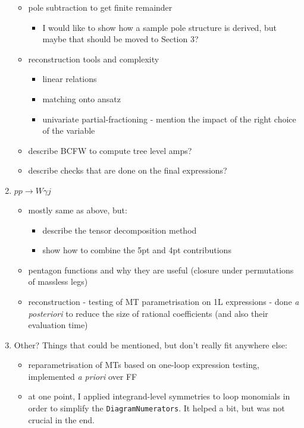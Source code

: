 \documentclass[main.tex]{subfiles}
\begin{document}
\begin{enumerate}
\begin{itemize}
        \item pole subtraction to get finite remainder
        \begin{itemize}
            \item I would like to show how a sample pole structure is derived, but maybe that should be moved to Section 3?
        \end{itemize}
        \item reconstruction tools and complexity
        \begin{itemize}
            \item linear relations
            \item matching onto ansatz
            \item univariate partial-fractioning - mention the impact of the right choice of the variable
        \end{itemize}
        \item describe BCFW to compute tree level amps?
        \item describe checks that are done on the final expressions?
    \end{itemize}
    
    \item $pp \rightarrow W \gamma j$
    \begin{itemize}
        \item mostly same as above, but:
        \begin{itemize}
            \item describe the tensor decomposition method
            \item show how to combine the 5pt and 4pt contributions
        \end{itemize}
        
        \item pentagon functions and why they are useful (closure under permutations of massless legs)
        \item reconstruction - testing of MT parametrisation on 1L expressions - done \textit{a posteriori} to reduce the size of rational coefficients (and also their evaluation time)
    \end{itemize}

    \item Other? Things that could be mentioned, but don't really fit anywhere else:
    \begin{itemize}
        \item reparametrisation of MTs based on one-loop expression testing, implemented \textit{a priori} over FF
        \item at one point, I applied integrand-level symmetries to loop monomials in order to simplify the \texttt{DiagramNumerators}. It helped a bit, but was not crucial in the end.
    \end{itemize}


\end{enumerate}
\end{document}
